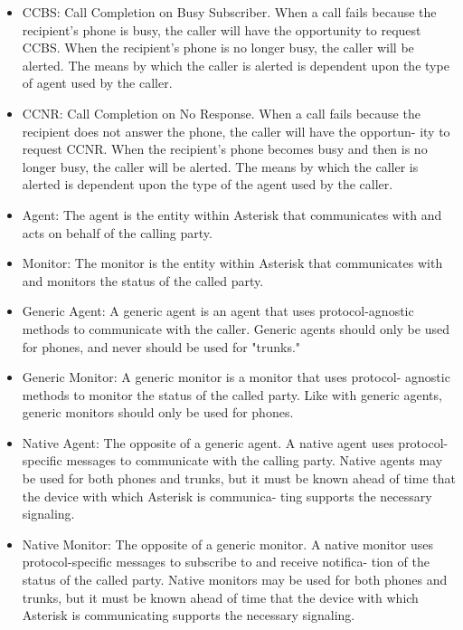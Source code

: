 \begin{itemize}
\item CCBS: Call Completion on Busy Subscriber. When a call fails because the
recipient's phone is busy, the caller will have the opportunity to
request CCBS. When the recipient's phone is no longer busy, the caller
will be alerted. The means by which the caller is alerted is dependent
upon the type of agent used by the caller.

\item CCNR: Call Completion on No Response. When a call fails because the
recipient does not answer the phone, the caller will have the opportun-
ity to request CCNR. When the recipient's phone becomes busy and then
is no longer busy, the caller will be alerted. The means by which the
caller is alerted is dependent upon the type of the agent used by the
caller.

\item Agent: The agent is the entity within Asterisk that communicates with
and acts on behalf of the calling party.

\item Monitor: The monitor is the entity within Asterisk that communicates
with and monitors the status of the called party.

\item Generic Agent: A generic agent is an agent that uses protocol-agnostic
methods to communicate with the caller. Generic agents should only be
used for phones, and never should be used for "trunks."

\item Generic Monitor: A generic monitor is a monitor that uses protocol-
agnostic methods to monitor the status of the called party. Like with
generic agents, generic monitors should only be used for phones.

\item Native Agent: The opposite of a generic agent. A native agent uses
protocol-specific messages to communicate with the calling party.
Native agents may be used for both phones and trunks, but it must be
known ahead of time that the device with which Asterisk is communica-
ting supports the necessary signaling.

\item Native Monitor: The opposite of a generic monitor. A native monitor
uses protocol-specific messages to subscribe to and receive notifica-
tion of the status of the called party. Native monitors may be used
for both phones and trunks, but it must be known ahead of time that
the device with which Asterisk is communicating supports the
necessary signaling.


\end{itemize}
